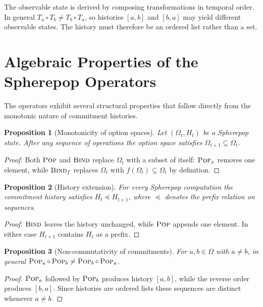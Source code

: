 \documentclass[12pt]{article}
\newtheorem{proposition}{Proposition}[section]
\newcommand{\Pop}{\operatorname{\textsc{Pop}}}
\newcommand{\Bind}{\operatorname{\textsc{Bind}}}
\newcommand{\Option}{\Omega}
\newcommand{\Seq}[1]{\left[#1\right]}
\begin{document}
The observable state is derived by composing transformations in temporal order. In general $T_a \circ T_b \neq T_b \circ T_a$, so histories $\Seq{a,b}$ and $\Seq{b,a}$ may yield different observable states. The history must therefore be an ordered list rather than a set.

\section{Algebraic Properties of the Spherepop Operators}
\label{sec:properties}

The operators exhibit several structural properties that follow directly from the monotonic nature of commitment histories.

\begin{proposition}[Monotonicity of option spaces]
Let $(\Option_t,H_t)$ be a Spherepop state. After any sequence of operations the option space satisfies $\Option_{t+1} \subseteq \Option_t$.
\end{proposition}

\begin{proof}
Both $\Pop$ and $\Bind$ replace $\Option_t$ with a subset of itself: $\Pop_x$ removes one element, while $\Bind_f$ replaces $\Option_t$ with $f(\Option_t) \subseteq \Option_t$ by definition.
\end{proof}

\begin{proposition}[History extension]
For every Spherepop computation the commitment history satisfies $H_t \preceq H_{t+1}$, where $\preceq$ denotes the prefix relation on sequences.
\end{proposition}

\begin{proof}
$\Bind$ leaves the history unchanged, while $\Pop$ appends one element. In either case $H_{t+1}$ contains $H_t$ as a prefix.
\end{proof}

\begin{proposition}[Non-commutativity of commitments]
For $a,b \in \Option$ with $a \neq b$, in general $\Pop_a \circ \Pop_b \neq \Pop_b \circ \Pop_a$.
\end{proposition}

\begin{proof}
$\Pop_a$ followed by $\Pop_b$ produces history $\Seq{a,b}$, while the reverse order produces $\Seq{b,a}$. Since histories are ordered lists these sequences are distinct whenever $a \neq b$.
\end{proof}
\end{document}
